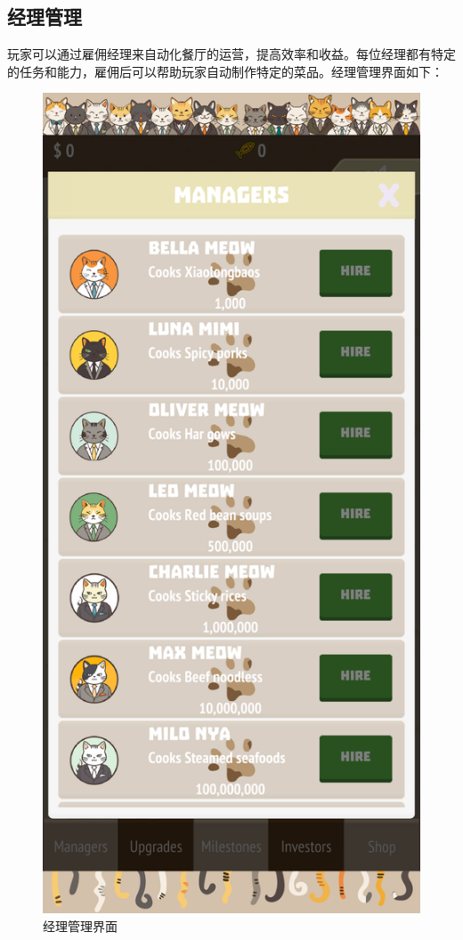 \documentclass{mancls}%
\begin{document}
\subsection{经理管理}

玩家可以通过雇佣经理来自动化餐厅的运营，提高效率和收益。每位经理都有特定的任务和能力，雇佣后可以帮助玩家自动制作特定的菜品。经理管理界面如下：

\begin{figure}[h]
  \centering
  \includegraphics[height=0.6\textheight]{screenshots/PurrfectEats_005.png}
  \caption{经理管理界面}
\end{figure}
\end{document}
